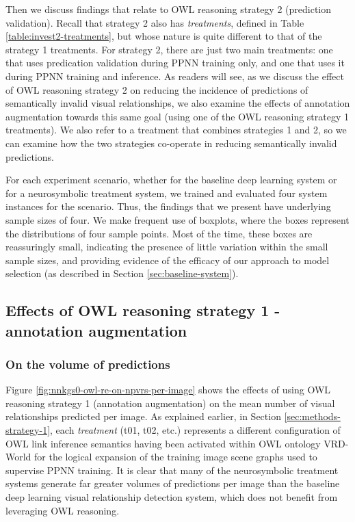 \documentclass[]{jair}
\begin{document}
Then we discuss findings that relate to OWL reasoning strategy 2 (prediction validation).
Recall that strategy 2 also has \emph{treatments}, defined in Table \ref{table:invest2-treatments}, but whose nature is quite different to that of the strategy 1 treatments.
For strategy 2, there are just two main treatments: one that uses predication validation during PPNN training only, and one that uses it during PPNN training and inference.
As readers will see, as we discuss the effect of OWL reasoning strategy 2 on reducing the incidence of predictions of semantically invalid visual relationships, we also examine the effects of annotation augmentation towards this same goal (using one of the OWL reasoning strategy 1 treatments).
We also refer to a treatment that combines strategies 1 and 2, so we can examine how the two strategies co-operate in reducing semantically invalid predictions.

For each experiment scenario, whether for the baseline deep learning system or for a neurosymbolic treatment system, we trained and evaluated four system instances for the scenario.
Thus, the findings that we present have underlying sample sizes of four.
We make frequent use of boxplots, where the boxes represent the distributions of four sample points.
Most of the time, these boxes are reassuringly small, indicating the presence of little variation within the small sample sizes, and providing evidence of the efficacy of our approach to model selection (as described in Section \ref{sec:baseline-system}).

\subsection{Effects of OWL reasoning strategy 1 - annotation augmentation}

\subsubsection{On the volume of predictions}

Figure \ref{fig:nnkgs0-owl-re-on-npvrs-per-image} shows the effects of using OWL reasoning strategy 1 (annotation augmentation) on the mean number of visual relationships predicted per image.
As explained earlier, in Section \ref{sec:methods-strategy-1}, each \emph{treatment} (t01, t02, etc.) represents a different configuration of OWL link inference semantics having been activated within OWL ontology VRD-World for the logical expansion of the training image scene graphs used to supervise PPNN training.
It is clear that many of the neurosymbolic treatment systems generate far greater volumes of predictions per image than the baseline deep learning visual relationship detection system, which does not benefit from leveraging OWL reasoning. 
\end{document}
